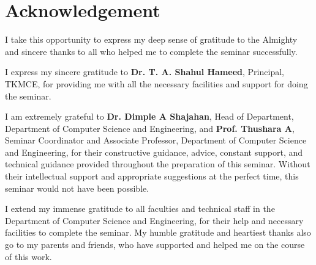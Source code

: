 \chapter*{Acknowledgement}%
%


I take this opportunity to express my deep sense of gratitude to the Almighty and sincere thanks to all who helped me to complete the seminar successfully. 

I express my sincere gratitude to \textbf{Dr. T. A. Shahul Hameed}, Principal, TKMCE, for providing me with all the necessary facilities and support for doing the seminar. 

I am extremely grateful to \textbf{Dr. Dimple A Shajahan}, Head of Department, Department of Computer Science and Engineering, and \textbf{Prof. Thushara A}, Seminar Coordinator and Associate Professor, Department of Computer Science and Engineering, for their constructive guidance, advice, constant support, and technical guidance provided throughout the preparation of this seminar. Without their intellectual support and appropriate suggestions at the perfect time, this seminar would not have been possible. 

I extend my immense gratitude to all faculties and technical staff in the Department of Computer Science and Engineering, for their help and necessary facilities to complete the seminar. My humble gratitude and heartiest thanks also go to my parents and friends, who have supported and helped me on the course of this work.


\vspace*{30pt}
\begin{flushright}
	\textbf{\author}
\end{flushright}
\thispagestyle{plain}
